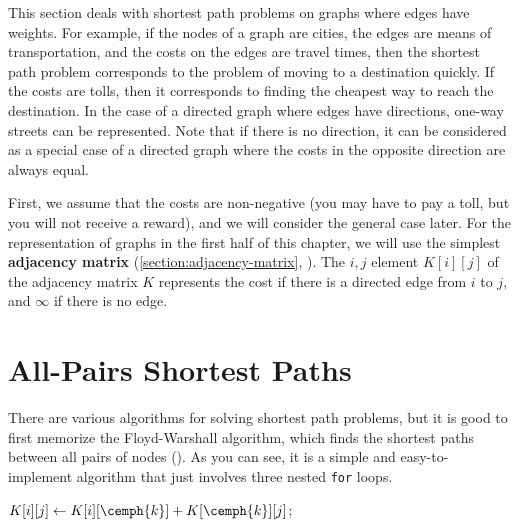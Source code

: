 This section deals with shortest path problems on graphs where edges have weights.
For example, if the nodes of a graph are cities, the edges are means of transportation, and the costs on the edges are travel times, then the shortest path problem corresponds to the problem of moving to a destination quickly.
If the costs are tolls, then it corresponds to finding the cheapest way to reach the destination.
In the case of a directed graph where edges have directions, one-way streets can be represented. Note that if there is no direction, it can be considered as a special case of a directed graph where the costs in the opposite direction are always equal.

First, we assume that the costs are non-negative (you may have to pay a toll, but you will not receive a reward), and we will consider the general case later.
For the representation of graphs in the first half of this chapter, we will use the simplest \textbf{adjacency matrix} (\ref{section:adjacency-matrix}, \pccbook[pp.~90,~91]).
The $i,j$ element $K[i][j]$ of the adjacency matrix $K$ represents the cost if there is a directed edge from $i$ to $j$, and $\infty$ if there is no edge.
\section{All-Pairs Shortest Paths}

There are various algorithms for solving shortest path problems, but it is good to first memorize the Floyd-Warshall algorithm, which finds the shortest paths between all pairs of nodes (\pccbook[p.~97]). As you can see, it is a simple and easy-to-implement algorithm that just involves three nested \texttt{for} loops.

\begin{algorithmic}[1]
\Statex
{}
\Statex
{}
\label{alg:floyd:relax}
\State $K[i][j] \gets K[i][\cemph{k}]+K[\cemph{k}][j]$;\label{alg:floyd:relax2}
\EndIf
\EndFor
\EndFor
\EndFor
\EndProcedure
\end{algorithmic}

